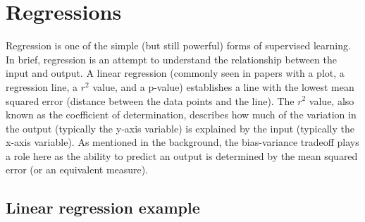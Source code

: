 \documentclass[12pt,openany]{book}
\begin{document}
\section{Regressions}\label{regressions}

Regression is one of the simple (but still powerful) forms of supervised
learning. In brief, regression is an attempt to understand the
relationship between the input and output. A linear regression (commonly
seen in papers with a plot, a regression line, a \(r^2\) value, and a
p-value) establishes a line with the lowest mean squared error (distance
between the data points and the line). The \(r^2\) value, also known as
the coefficient of determination, describes how much of the variation in
the output (typically the y-axis variable) is explained by the input
(typically the x-axis variable). As mentioned in the background, the
bias-variance tradeoff plays a role here as the ability to predict an
output is determined by the mean squared error (or an equivalent
measure).

\subsection{Linear regression example}\label{linear-regression-example}
\end{document}

